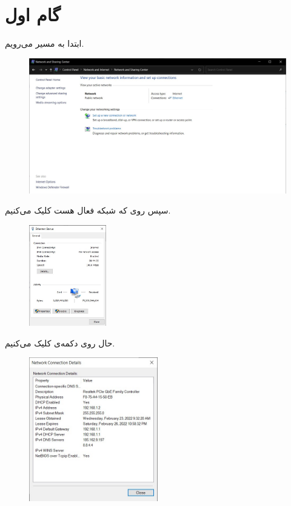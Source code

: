 \documentclass{article}
\begin{document}


\newpage



\section{گام اول}
ابتدا به مسیر
می‌رویم.
\begin{figure}[H]
    \centering
    \includegraphics[width=1.0\textwidth]{figures/1.1.jpg}
    \caption
	{
	}
    \label{fig:fig1}
\end{figure}
سپس روی  که شبکه فعال هست کلیک می‌کنیم.
\begin{figure}[H]
    \centering
    \includegraphics[width=0.3\textwidth]{figures/1.2.jpg}
    \caption
	{
	}
    \label{fig:fig1}
\end{figure}
حال روی دکمه‌ی  کلیک می‌کنیم.
\begin{figure}[H]
    \centering
    \includegraphics[width=0.5\textwidth]{figures/1.3.jpg}
    \caption
	{
	}
    \label{fig:fig1}
\end{figure}
\end{document}
